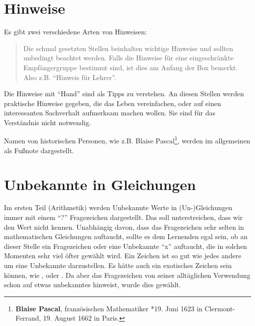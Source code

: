 \section{Hinweise}

Es gibt zwei verschiedene Arten von Hinweisen: 

\begin{quote}
Die schmal gesetzten Stellen beinhalten wichtige Hinweise und sollten unbedingt beachtet werden. Falls die Hinweise für eine eingeschränkte Empfängergruppe bestimmt sind, ist dies am Anfang der Box bemerkt. Also z.B. "`Hinweis für Lehrer"'. 
\end{quote}

\bigskip

\HandRight \qquad Die Hinweise mit "`Hand"' sind als Tipps zu verstehen. An diesen Stellen werden praktische Hinweise gegeben, die das Leben vereinfachen, oder auf einen interessanten Sachverhalt aufmerksam machen wollen. Sie sind für das Verständnis nicht notwendig. 

\bigskip

Namen von historischen Personen, wie z.B. Blaise Pascal\footnote{\textbf{Blaise Pascal}, französischen Mathematiker *19. Juni 1623 in Clermont-Ferrand, 19. August 1662 in Paris.}, werden im allgemeinen als Fußnote dargestellt. 


\section{Unbekannte in Gleichungen}

Im ersten Teil (Arithmetik) werden Unbekannte Werte in (Un-)Gleichungen immer mit einem "`?"' Fragezeichen dargestellt. Das soll unterstreichen, dass wir den Wert nicht kennen. Unabhängig davon, dass das Fragezeichen sehr selten in mathematischen Gleichungen auftaucht, sollte es dem Lernenden egal sein, ob an dieser Stelle ein Fragezeichen oder eine Unbekannte "`x"' auftaucht, die in solchen Momenten sehr viel öfter gewählt wird. Ein Zeichen ist so gut wie jedes andere um eine Unbekannte darzustellen. Es hätte auch ein exotisches Zeichen sein können, wie , oder . Da aber das Fragezeichen von seiner alltäglichen Verwendung schon auf etwas unbekanntes hinweist, wurde dies gewählt. 


